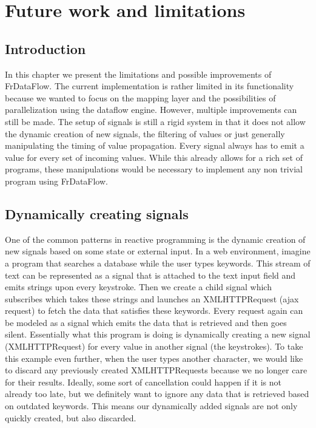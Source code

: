 \chapter{Future work and limitations}

\section{Introduction}

In this chapter we present the limitations and possible improvements of FrDataFlow. 
The current implementation is rather limited in its functionality because we wanted to focus on the mapping layer and the possibilities of parallelization using the dataflow engine.
However, multiple improvements can still be made. The setup of signals is still a rigid system in that it does not allow the dynamic creation of new signals, the filtering of values or just generally manipulating the timing of value propagation. Every signal always has to emit a value for every set of incoming values. While this already allows for a rich set of programs, these manipulations would be necessary to implement any non trivial program using FrDataFlow. 

\section{Dynamically creating signals}

One of the common patterns in reactive programming is the dynamic creation of new signals based on some state or external input.
In a web environment, imagine a program that searches a database while the user types keywords. This stream of text can be represented as a signal that is attached to the text input field and emits strings upon every keystroke. Then we create a child signal which subscribes which takes these strings and launches an XMLHTTPRequest (ajax request) to fetch the data that satisfies these keywords. Every request again can be modeled as a signal which emits the data that is retrieved and then goes silent. Essentially what this program is doing is dynamically creating a new signal (XMLHTTPRequest) for every value in another signal (the keystrokes). To take this example even further, when the user types another character, we would like to discard any previously created XMLHTTPRequests because we no longer care for their results. Ideally, some sort of cancellation could happen if it is not already too late, but we definitely want to ignore any data that is retrieved based on outdated keywords. This means our dynamically added signals are not only quickly created, but also discarded.

